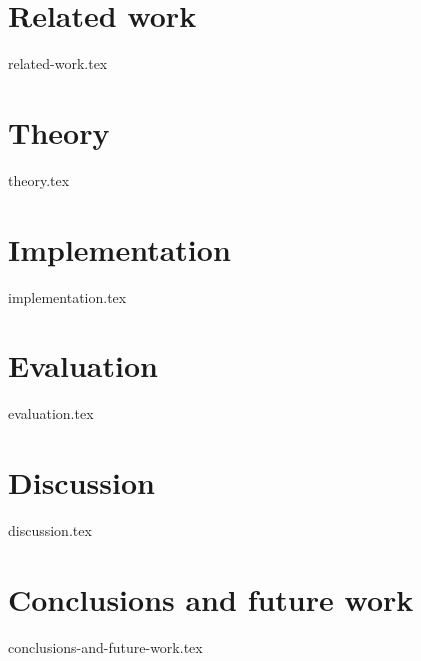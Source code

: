 \documentclass[12pt, a4paper]{article}
\begin{document}
\newpage
\section{Related work}
\label{sec:relatedwork}
{related-work.tex}

\newpage
\section{Theory}
\label{sec:theory}
{theory.tex}

\newpage
\section{Implementation}
\label{sec:implementation}
{implementation.tex}

\newpage
\section{Evaluation}
\label{sec:evaluation}
{evaluation.tex}

\newpage
\section{Discussion}
\label{sec:discussion}
{discussion.tex}

\newpage
\section{Conclusions and future work}
\label{sec:conclusions}
{conclusions-and-future-work.tex}

\clearpage
\printbibliography
\end{document}
